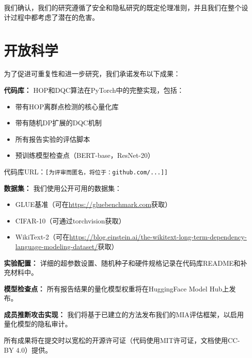 \documentclass[letterpaper,twocolumn,10pt]{article}
\begin{document}
我们确认，我们的研究遵循了安全和隐私研究的既定伦理准则，并且我们在整个设计过程中都考虑了潜在的危害。

\cleardoublepage

\section*{开放科学}
\label{sec:open_science}

为了促进可重复性和进一步研究，我们承诺发布以下成果：

\textbf{代码库：} HOP和DQC算法在PyTorch中的完整实现，包括：
\begin{itemize}
\item 带有HOP离群点检测的核心量化库
\item 带有随机DP扩展的DQC机制
\item 所有报告实验的评估脚本
\item 预训练模型检查点（BERT-base，ResNet-20）
\end{itemize}
代码库URL：\texttt{[为评审而匿名，将位于：github.com/...]]}

\textbf{数据集：} 我们使用公开可用的数据集：
\begin{itemize}
\item GLUE基准（可在\url{https://gluebenchmark.com}获取）
\item CIFAR-10（可通过torchvision获取）
\item WikiText-2（可在\url{https://blog.einstein.ai/the-wikitext-long-term-dependency-language-modeling-dataset/}获取）
\end{itemize}

\textbf{实验配置：} 详细的超参数设置、随机种子和硬件规格记录在代码库README和补充材料中。

\textbf{模型检查点：} 所有报告结果的量化模型权重将在HuggingFace Model Hub上发布。

\textbf{成员推断攻击实现：} 我们将基于已建立的方法发布我们的MIA评估框架，以启用量化模型的隐私审计。

所有成果将在提交时以宽松的开源许可证（代码使用MIT许可证，文档使用CC-BY 4.0）提供。

\cleardoublepage




\end{document}
